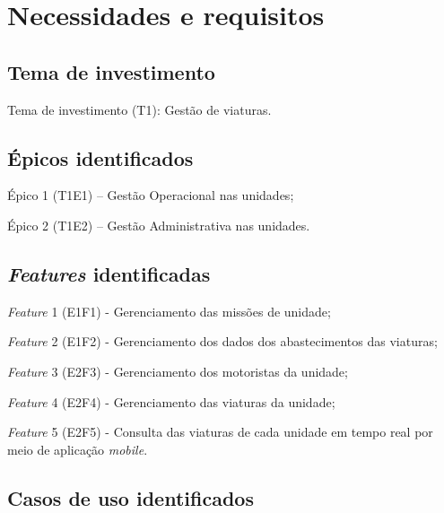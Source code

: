 \chapter{Necessidades e requisitos}
  
  \section{Tema de investimento}
  
  Tema de investimento (T1): Gestão de viaturas.
  
  \section{Épicos identificados}
    
  Épico 1 (T1E1) – Gestão Operacional nas unidades;
  
  Épico 2 (T1E2) – Gestão Administrativa nas unidades.
  
  \section{\textit{Features} identificadas}
  
  \textit{Feature} 1 (E1F1) - Gerenciamento das missões de unidade;
  
  \textit{Feature} 2 (E1F2) - Gerenciamento dos dados dos abastecimentos das viaturas;
  
  \textit{Feature} 3 (E2F3) - Gerenciamento dos motoristas da unidade;
  
  \textit{Feature} 4 (E2F4) - Gerenciamento das viaturas da unidade;
  
  \textit{Feature} 5 (E2F5) - Consulta das viaturas de cada unidade em tempo real por meio de aplicação \textit{mobile}. 
  
  \section{Casos de uso identificados} 
    
